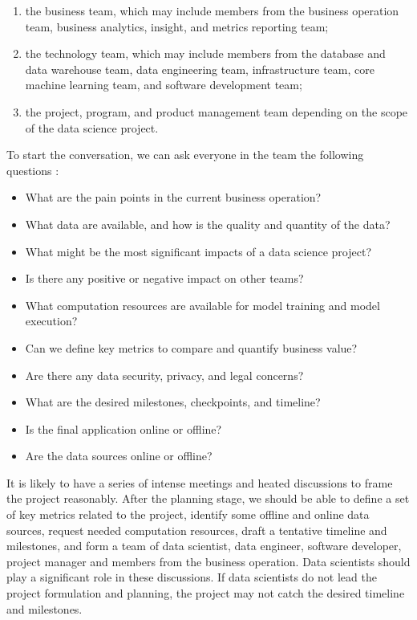 \documentclass[
  12pt,
]{krantz}
\providecommand{\tightlist}{%
  \setlength{\itemsep}{0pt}\setlength{\parskip}{0pt}}
\begin{document}
\begin{enumerate}
\def\labelenumi{(\arabic{enumi})}
\item
  the business team, which may include members from the business operation team, business analytics, insight, and metrics reporting team;
\item
  the technology team, which may include members from the database and data warehouse team, data engineering team, infrastructure team, core machine learning team, and software development team;
\item
  the project, program, and product management team depending on the scope of the data science project.
\end{enumerate}

To start the conversation, we can ask everyone in the team the following questions :

\begin{itemize}
\tightlist
\item
  What are the pain points in the current business operation?
\item
  What data are available, and how is the quality and quantity of the data?
\item
  What might be the most significant impacts of a data science project?
\item
  Is there any positive or negative impact on other teams?
\item
  What computation resources are available for model training and model execution?
\item
  Can we define key metrics to compare and quantify business value?
\item
  Are there any data security, privacy, and legal concerns?
\item
  What are the desired milestones, checkpoints, and timeline?
\item
  Is the final application online or offline?
\item
  Are the data sources online or offline?
\end{itemize}

It is likely to have a series of intense meetings and heated discussions to frame the project reasonably. After the planning stage, we should be able to define a set of key metrics related to the project, identify some offline and online data sources, request needed computation resources, draft a tentative timeline and milestones, and form a team of data scientist, data engineer, software developer, project manager and members from the business operation. Data scientists should play a significant role in these discussions. If data scientists do not lead the project formulation and planning, the project may not catch the desired timeline and milestones.
\end{document}
